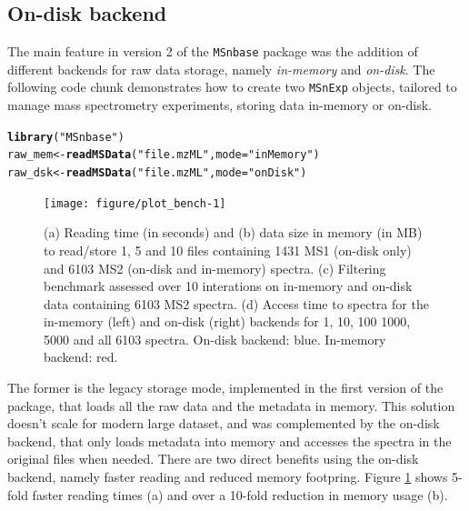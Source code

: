 \documentclass[journal=jacsat,manuscript=article]{achemso}\usepackage[]{graphicx}\usepackage[]{color}
\makeatletter
\newcommand{\hlstr}[1]{\textcolor[rgb]{0.192,0.494,0.8}{#1}}%
\newcommand{\hlstd}[1]{\textcolor[rgb]{0.345,0.345,0.345}{#1}}%
\newcommand{\hlkwb}[1]{\textcolor[rgb]{0.69,0.353,0.396}{#1}}%
\newcommand{\hlkwc}[1]{\textcolor[rgb]{0.333,0.667,0.333}{#1}}%
\newcommand{\hlkwd}[1]{\textcolor[rgb]{0.737,0.353,0.396}{\textbf{#1}}}%
\newenvironment{kframe}{%
 \def\at@end@of@kframe{}%
 \ifinner\ifhmode%
  \def\at@end@of@kframe{\end{minipage}}%
  \begin{minipage}{\columnwidth}%
 \fi\fi%
 \def\FrameCommand##1{\hskip\@totalleftmargin \hskip-\fboxsep
 \colorbox{shadecolor}{##1}\hskip-\fboxsep
     \hskip-\linewidth \hskip-\@totalleftmargin \hskip\columnwidth}%
 \MakeFramed {\advance\hsize-\width
   \@totalleftmargin\z@ \linewidth\hsize
   \@setminipage}}%
 {\par\unskip\endMakeFramed%
 \at@end@of@kframe}
\newenvironment{knitrout}{}{} %
\makeatother
\begin{document}
\subsection{On-disk backend}

The main feature in version 2 of the \texttt{MSnbase} package was the
addition of different backends for raw data storage, namely
\textit{in-memory} and \textit{on-disk}. The following code chunk
demonstrates how to create two \texttt{MSnExp} objects, tailored to
manage mass spectrometry experiments, storing data in-memory or
on-disk.

\begin{knitrout}
\color{fgcolor}\begin{kframe}
\begin{alltt}
\hlkwd{library}\hlstd{(}\hlstr{"MSnbase"}\hlstd{)}
\hlstd{raw_mem} \hlkwb{<-} \hlkwd{readMSData}\hlstd{(}\hlstr{"file.mzML"}\hlstd{,} \hlkwc{mode} \hlstd{=} \hlstr{"inMemory"}\hlstd{)}
\hlstd{raw_dsk} \hlkwb{<-} \hlkwd{readMSData}\hlstd{(}\hlstr{"file.mzML"}\hlstd{,} \hlkwc{mode} \hlstd{=} \hlstr{"onDisk"}\hlstd{)}
\end{alltt}
\end{kframe}
\end{knitrout}







\begin{figure}[p]
  \centering
\begin{knitrout}
\color{fgcolor}
\texttt{[image: figure/plot\_bench-1]} 

\end{knitrout}
\caption{(a) Reading time (in seconds) and (b) data size in memory (in
  MB) to read/store 1, 5 and 10 files containing 1431 MS1 (on-disk
  only) and 6103 MS2 (on-disk and in-memory) spectra. (c) Filtering
  benchmark assessed over 10 interations on in-memory and on-disk data
  containing 6103 MS2 spectra.  (d) Access time to spectra for the
  in-memory (left) and on-disk (right) backends for 1, 10, 100 1000,
  5000 and all 6103 spectra. On-disk backend: blue. In-memory backend:
  red. }
\label{fig:bench}
\end{figure}


The former is the legacy storage mode, implemented in the first
version of the package, that loads all the raw data and the metadata
in memory. This solution doesn't scale for modern large dataset, and
was complemented by the on-disk backend, that only loads metadata into
memory and accesses the spectra in the original files when
needed. There are two direct benefits using the on-disk backend,
namely faster reading and reduced memory footpring. Figure
\ref{fig:bench} shows 5-fold faster reading times (a) and over a
10-fold reduction in memory usage (b).
\end{document}
